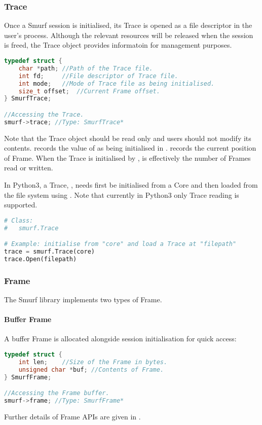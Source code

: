 \subsubsection{Trace}
Once a Smurf session is initialised, its Trace is opened as a file descriptor in the user's process. Although the relevant resources will be released when the session is freed, the Trace object provides informatoin for management purposes.
\begin{lstlisting}[language=C++, caption={struct SmurfTrace\label{api:TraceC}}]
typedef struct {
	char *path;	//Path of the Trace file.
	int fd;		//File descriptor of Trace file.
	int mode;	//Mode of Trace file as being initialised.
	size_t offset;	//Current Frame offset.
} SmurfTrace;

//Accessing the Trace.
smurf->trace; //Type: SmurfTrace*
\end{lstlisting}

Note that the Trace object should be read only and users should not modify its contents.  records the value of  as being initialised in .  records the current position of Frame. When the Trace is initialised by ,  is effectively the number of Frames read or written.

In Python3, a Trace, , needs first be initialised from a Core and then loaded from the file system using . Note that currently in Python3 only Trace reading is supported.
\begin{lstlisting}[language=Python,caption={smurf.Trace\label{api:Core.TraceP}}]
# Class:
#	smurf.Trace

# Example: initialise from "core" and load a Trace at "filepath"
trace = smurf.Trace(core)
trace.Open(filepath)
\end{lstlisting}

\subsubsection{Frame}
The Smurf library implements two types of Frame.

\paragraph{Buffer Frame}
A buffer Frame is allocated alongside session initialisation for quick access:
\begin{lstlisting}[language=C++, caption={struct SmurfFrame\label{api:FrameC}}]
typedef struct {
	int len;	//Size of the Frame in bytes.
	unsigned char *buf;	//Contents of Frame.
} SmurfFrame;

//Accessing the Frame buffer.
smurf->frame; //Type: SmurfFrame*
\end{lstlisting}
Further details of Frame APIs are given in .


